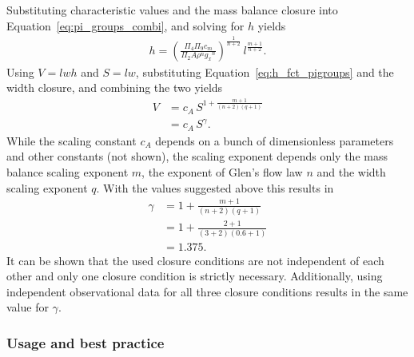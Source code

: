             Substituting characteristic values and the mass balance closure into Equation~\ref{eq:pi_groups_combi}, and solving for $h$ yields
            \begin{align}\label{eq:h_fct_pigroups}
                h = \left(\frac{\Pi_4 \Pi_9 c_m}{\Pi_2 A\rho^n {g_x}^n}\right)^\frac{1}{n+2}\, l^\frac{m+1}{n+2}.
            \end{align}
            Using $V = lwh$ and $S=lw$, substituting Equation~\ref{eq:h_fct_pigroups} and the width closure, and combining the two yields
            \begin{align}\label{eq:vas_exponent}
                V &= c_A\, S^{1+\frac{m+1}{(n+2)(q+1)}}\\
                  &= c_A\, S^\gamma.
            \end{align}
            While the scaling constant $c_A$ depends on a bunch of dimensionless parameters and other constants (not shown), the scaling exponent depends only the mass balance scaling exponent $m$, the exponent of Glen's flow law $n$ and the width scaling exponent $q$. With the values suggested above this results in
            \begin{align}
                \gamma &= 1 + \frac{m+1}{(n+2)(q+1)}\\
                       &= 1 + \frac{2+1}{(3+2)(0.6+1)}\\ 
                       &= 1.375.
            \end{align}
            It can be shown that the used closure conditions are not independent of each other and only one closure condition is strictly necessary. Additionally, using independent observational data for all three closure conditions results in the same value for $\gamma$.            
        

        \subsubsection{Usage and best practice} %
        \label{ssub:}

